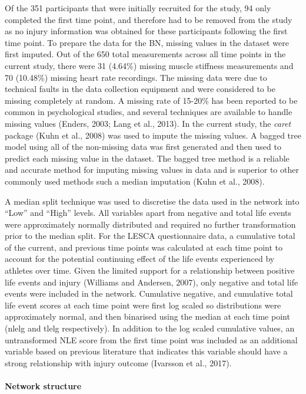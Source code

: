 \documentclass[
  english,
  man,floatsintext]{apa6}
\let\oldparagraph\paragraph
\renewcommand{\paragraph}[1]{\oldparagraph{#1}\mbox{}}
\begin{document}
Of the 351 participants that were initially recruited for the study, 94 only completed the first time point, and therefore had to be removed from the study as no injury information was obtained for these participants following the first time point.
To prepare the data for the BN, missing values in the dataset were first imputed.
Out of the 650 total measurements across all time points in the current study, there were 31 (4.64\%) missing muscle stiffness measurements and 70 (10.48\%) missing heart rate recordings. The missing data were due to technical faults in the data collection equipment and were considered to be missing completely at random.
A missing rate of 15-20\% has been reported to be common in psychological studies, and several techniques are available to handle missing values (Enders, 2003; Lang et al., 2013).
In the current study, the \emph{caret} package (Kuhn et al., 2008) was used to impute the missing values.
A bagged tree model using all of the non-missing data was first generated and then used to predict each missing value in the dataset.
The bagged tree method is a reliable and accurate method for imputing missing values in data and is superior to other commonly used methods such a median imputation (Kuhn et al., 2008).

A median split technique was used to discretise the data used in the network into ``Low'' and ``High'' levels.
All variables apart from negative and total life events were approximately normally distributed and required no further transformation prior to the median split.
For the LESCA questionnaire data, a cumulative total of the current, and previous time points was calculated at each time point to account for the potential continuing effect of the life events experienced by athletes over time.
Given the limited support for a relationship between positive life events and injury (Williams and Andersen, 2007), only negative and total life events were included in the network.
Cumulative negative, and cumulative total life event scores at each time point were first log scaled so distributions were approximately normal, and then binarised using the median at each time point (nlelg and tlelg respectively).
In addition to the log scaled cumulative values, an untransformed NLE score from the first time point was included as an additional variable based on previous literature that indicates this variable should have a strong relationship with injury outcome (Ivarsson et al., 2017).

\hypertarget{network-structure}{%
\paragraph{Network structure}\label{network-structure}}
\end{document}
